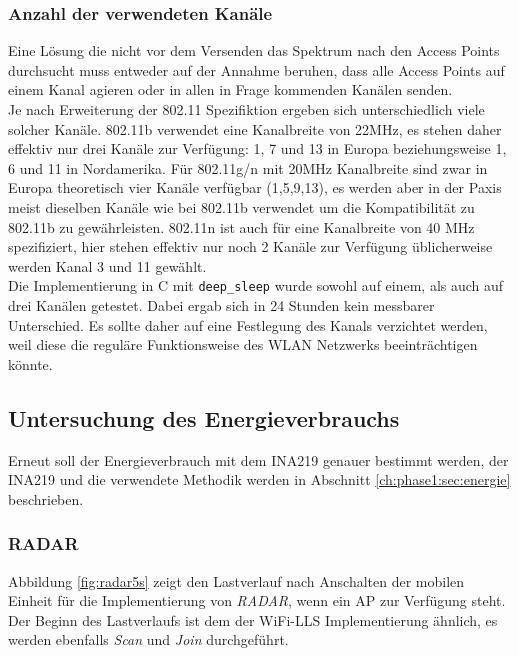 \subsubsection{Anzahl der verwendeten Kanäle}
Eine Lösung die nicht vor dem Versenden das Spektrum nach den Access Points durchsucht muss entweder auf der Annahme beruhen, dass alle Access Points auf einem Kanal agieren oder in allen in Frage kommenden Kanälen senden.\\
Je nach Erweiterung der 802.11 Spezifiktion ergeben sich unterschiedlich viele solcher Kanäle.
802.11b verwendet eine Kanalbreite von 22MHz, es stehen daher effektiv nur drei Kanäle zur Verfügung: 1, 7 und 13 in Europa beziehungsweise 1, 6 und 11 in Nordamerika.
Für 802.11g/n mit 20MHz Kanalbreite sind zwar in Europa theoretisch vier Kanäle verfügbar (1,5,9,13), es werden aber in der Paxis meist dieselben Kanäle wie bei 802.11b verwendet um die Kompatibilität zu 802.11b zu gewährleisten.
802.11n ist auch für eine Kanalbreite von 40 MHz spezifiziert, hier stehen effektiv nur noch 2 Kanäle zur Verfügung üblicherweise werden Kanal 3 und 11 gewählt.\\
Die Implementierung in C mit \texttt{deep\_sleep} wurde sowohl auf einem, als auch auf drei Kanälen getestet.
Dabei ergab sich in 24 Stunden kein messbarer Unterschied.
Es sollte daher auf eine Festlegung des Kanals verzichtet werden, weil diese die reguläre Funktionsweise des WLAN Netzwerks beeinträchtigen könnte.


\subsection{Untersuchung des Energieverbrauchs}
Erneut soll der Energieverbrauch mit dem INA219 genauer bestimmt werden, der INA219 und die verwendete Methodik werden in Abschnitt \ref{ch:phase1:sec:energie} beschrieben.


\subsubsection{RADAR}
\label{ch:phase2:sec:powerradar}
Abbildung \ref{fig:radar5s} zeigt den Lastverlauf nach Anschalten der mobilen Einheit für die Implementierung von \emph{RADAR}, wenn ein AP zur Verfügung steht. 
Der Beginn des Lastverlaufs ist dem der WiFi-LLS Implementierung ähnlich, es werden ebenfalls \emph{Scan} und \emph{Join} durchgeführt.\\

